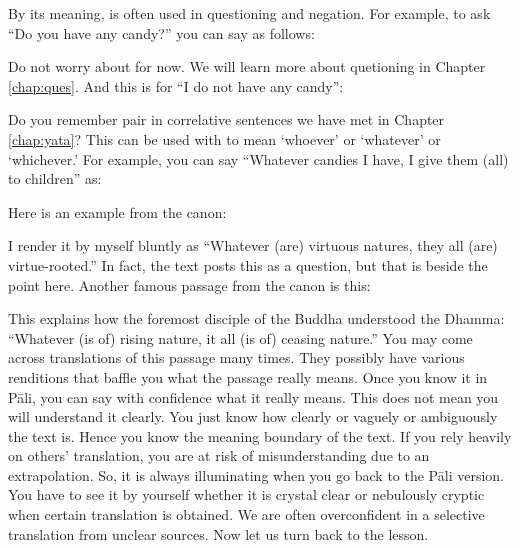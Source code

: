 By its meaning,  is often used in questioning and negation. For example, to ask ``Do you have any candy?'' you can say as follows:


Do not worry about  for now. We will learn more about quetioning in Chapter \ref{chap:ques}. And this is for ``I do not have any candy'':


Do you remember  pair in correlative sentences we have met in Chapter \ref{chap:yata}? This can be used with  to mean `whoever' or `whatever' or `whichever.' For example, you can say ``Whatever candies I have, I give them (all) to children'' as:


Here is an example from the canon:


I render it by myself bluntly as ``Whatever (are) virtuous natures, they all (are) virtue-rooted.'' In fact, the text posts this as a question, but that is beside the point here. Another famous passage from the canon is this:


This explains how the foremost disciple of the Buddha understood the Dhamma: ``Whatever (is of) rising nature, it all (is of) ceasing nature.'' You may come across translations of this passage many times. They possibly have various renditions that baffle you what the passage really means. Once you know it in P\=ali, you can say with confidence what it really means. This does not mean you will understand it clearly. You just know how clearly or vaguely or ambiguously the text is. Hence you know the meaning boundary of the text. If you rely heavily on others' translation, you are at risk of misunderstanding due to an extrapolation. So, it is always illuminating when you go back to the P\=ali version. You have to see it by yourself whether it is crystal clear or nebulously cryptic when certain translation is obtained. We are often overconfident in a selective translation from unclear sources. Now let us turn back to the lesson.

